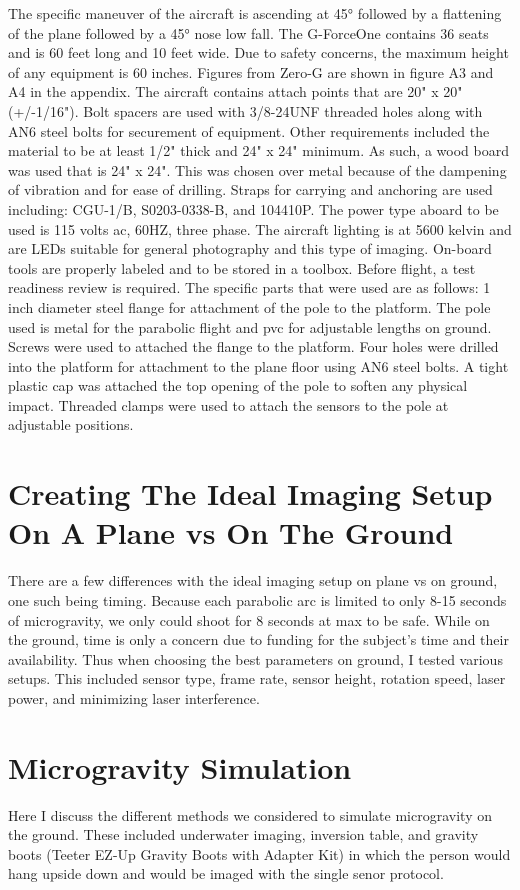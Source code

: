 The specific maneuver of the aircraft is ascending at \ang{45} followed by a flattening of the plane followed by a \ang{45} nose low fall. The G-ForceOne contains 36 seats and is 60 feet long and 10 feet wide. Due to safety concerns, the maximum height of any equipment is 60 inches. Figures from Zero-G are shown in figure A3 and A4 in the appendix. The aircraft contains attach points that are 20" x 20" (+/-1/16"). Bolt spacers are used with 3/8-24UNF threaded holes along with AN6 steel bolts for securement of equipment. Other requirements included the material to be at least 1/2" thick and 24" x 24" minimum. As such, a wood board was used that is 24" x 24". This was chosen over metal because of the dampening of vibration and for ease of drilling. Straps for carrying and anchoring are used including: CGU-1/B, S0203-0338-B, and 104410P. The power type aboard to be used is 115 volts ac, 60HZ, three phase. The aircraft lighting is at 5600 kelvin and are LEDs suitable for general photography and this type of imaging. On-board tools are properly labeled and to be stored in a toolbox. Before flight, a test readiness review is required.
The specific parts that were used are as follows: 1 inch diameter steel flange for attachment of the pole to the platform. The pole used is metal for the parabolic flight and pvc for adjustable lengths on ground. Screws were used to attached the flange to the platform. Four holes were drilled into the platform for attachment to the plane floor using AN6 steel bolts. A tight plastic cap was attached the top opening of the pole to soften any physical impact. Threaded clamps were used to attach the sensors to the pole at adjustable positions.

\section{Creating The Ideal Imaging Setup On A Plane vs On The Ground}
There are a few differences with the ideal imaging setup on plane vs on ground, one such being timing. Because each parabolic arc is limited to only 8-15 seconds of microgravity, we only could shoot for 8 seconds at max to be safe. While on the ground, time is only a concern due to funding for the subject's time and their availability. Thus when choosing the best parameters on ground, I tested various setups. This included sensor type, frame rate, sensor height, rotation speed, laser power, and minimizing laser interference.
\section{Microgravity Simulation}
Here I discuss the different methods we considered to simulate microgravity on the ground. These included underwater imaging, inversion table, and gravity boots (Teeter EZ-Up Gravity Boots with Adapter Kit) in which the person would hang upside down and would be imaged with the single senor protocol.

